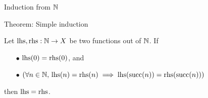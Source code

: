 
\begin{frame}{Induction from $\mathbb{N}$}
  


  \begin{block}{Theorem: Simple induction}
    \par Let $\mathrm{lhs}, \mathrm{rhs} : \mathbb{N} \to X$ be two functions out of $\mathbb{N}$. If
    \begin{itemize}[nosep]
      \item[$\bullet$] $\mathrm{lhs}(0) = \mathrm{rhs}(0)$, and
      \item[$\bullet$] $(\forall n \in \mathbb{N},\, \mathrm{lhs}(n) = \mathrm{rhs}(n) \implies \mathrm{lhs}( \operatorname{succ} (n) ) = \mathrm{rhs} ( \operatorname{succ} (n) ))$
    \end{itemize}
    then $\mathrm{lhs} = \mathrm{rhs}$.
  \end{block}

\end{frame}

